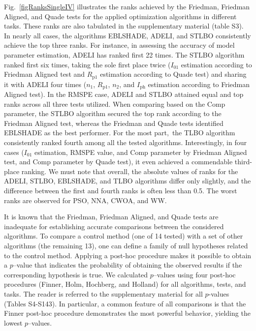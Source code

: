 \documentclass[a4paper,fleqn]{cas-sc}
\begin{document}
Fig.~\ref{figRanksSingleIV} illustrates the ranks achieved 
by the Friedman, Friedman Aligned, and Quade tests for the applied optimization algorithms in different tasks. 
These ranks are also tabulated in the supplementary material (table S3). 
In nearly all cases, the algorithms EBLSHADE, ADELI, and STLBO consistently achieve the top three ranks. 
For instance, in assessing the accuracy of model parameter estimation, ADELI has ranked first  22 times.
The STLBO algorithm ranked first six times, 
taking the sole first place twice ($I_{01}$ estimation according to Friedman Aligned test and
$R_\mathrm{p1}$ estimation according to Quade test) 
and sharing it with ADELI four times ($n_1$, $R_\mathrm{p1}$, $n_2$, and $I_\mathrm{ph}$ 
estimation according to Friedman Aligned test).
In the RMSPE  case, ADELI and STLBO attained equal and top ranks across all three tests utilized.
When comparing based on the Comp parameter, 
the STLBO algorithm secured the top rank according to the Friedman Aligned test, 
whereas the Friedman and Quade tests identified EBLSHADE as the best performer.
For the most part, the TLBO algorithm consistently ranked fourth among all the tested algorithms.
Interestingly, in four cases ($I_{01}$ estimation, RMSPE value, and Comp parameter by Friedman Aligned test,
and Comp parameter by Quade test),
it even achieved a commendable third-place ranking.
We must note that overall, the absolute values of ranks for the ADELI, STLBO, EBLSHADE, 
and TLBO algorithms differ only slightly, and the difference between the first and fourth ranks is often less than 0.5.
The worst ranks are observed for PSO, NNA, CWOA, and WW.

It is known \cite{Derrac2011} that 
the Friedman, Friedman Aligned, and Quade tests are inadequate for establishing accurate comparisons between the considered algorithms.
To compare a control method (one of 14 tested) 
with a set of other algorithms (the remaining 13), 
one can define a family of null hypotheses related to the control method.
Applying a post-hoc procedure makes it possible to obtain a $p$--value that indicates 
the probability of obtaining the observed results if the corresponding hypothesis is true.
We calculated $p$--values using four post-hoc procedures (Finner, Holm, Hochberg, and Holland) for all algorithms, tests, and tasks.
The reader is referred to the supplementary material for all $p$-values (Tables S4-S143).
In particular, a common feature of all comparisons is that 
the Finner post-hoc procedure demonstrates the most powerful behavior, yielding the lowest $p$--values.
\end{document}
